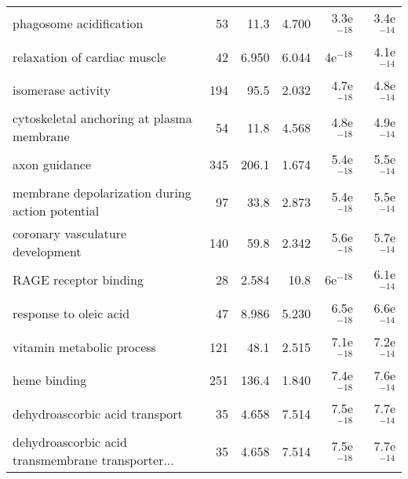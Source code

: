 \begin{longtable}{lrrrrr}
                           phagosome acidification &                      53 &                    11.3 &      4.700 &         3.3e$^{-18}$ &         3.4e$^{-14}$ \\
                      relaxation of cardiac muscle &                      42 &                   6.950 &      6.044 &           4e$^{-18}$ &         4.1e$^{-14}$ \\
                                isomerase activity &                     194 &                    95.5 &      2.032 &         4.7e$^{-18}$ &         4.8e$^{-14}$ \\
         cytoskeletal anchoring at plasma membrane &                      54 &                    11.8 &      4.568 &         4.8e$^{-18}$ &         4.9e$^{-14}$ \\
                                     axon guidance &                     345 &                   206.1 &      1.674 &         5.4e$^{-18}$ &         5.5e$^{-14}$ \\
   membrane depolarization during action potential &                      97 &                    33.8 &      2.873 &         5.4e$^{-18}$ &         5.5e$^{-14}$ \\
                  coronary vasculature development &                     140 &                    59.8 &      2.342 &         5.6e$^{-18}$ &         5.7e$^{-14}$ \\
                             RAGE receptor binding &                      28 &                   2.584 &       10.8 &           6e$^{-18}$ &         6.1e$^{-14}$ \\
                            response to oleic acid &                      47 &                   8.986 &      5.230 &         6.5e$^{-18}$ &         6.6e$^{-14}$ \\
                         vitamin metabolic process &                     121 &                    48.1 &      2.515 &         7.1e$^{-18}$ &         7.2e$^{-14}$ \\
                                      heme binding &                     251 &                   136.4 &      1.840 &         7.4e$^{-18}$ &         7.6e$^{-14}$ \\
                    dehydroascorbic acid transport &                      35 &                   4.658 &      7.514 &         7.5e$^{-18}$ &         7.7e$^{-14}$ \\
 dehydroascorbic acid transmembrane transporter... &                      35 &                   4.658 &      7.514 &         7.5e$^{-18}$ &         7.7e$^{-14}$ \\

\end{longtable}
